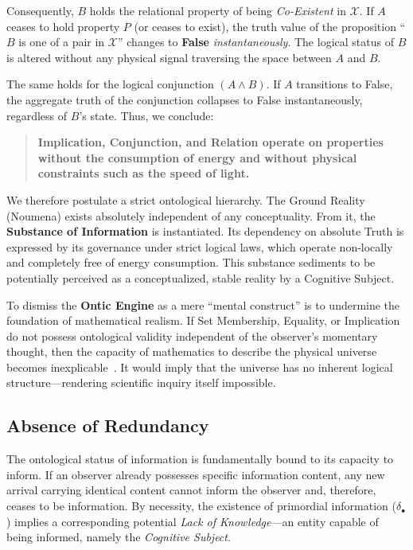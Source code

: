 \documentclass[11pt, a4paper]{article}
\theoremstyle{formalism}
\begin{document}
Consequently, $B$ holds the relational property of being \textit{Co-Existent}
in $\mathcal{X}$. If $A$ ceases to hold property $P$ (or ceases to exist), the
truth value of the proposition ``$B$ is one of a pair in $\mathcal{X}$''
changes to \textbf{False} \textit{instantaneously}. The logical status of $B$
is altered without any physical signal traversing the space between $A$ and
$B$.

The same holds for the logical conjunction $(A \land B)$. If $A$ transitions
to False, the aggregate truth of the conjunction collapses to False
instantaneously, regardless of $B$'s state. Thus, we conclude:

\begin{quote}
    \textbf{Implication, Conjunction, and Relation operate on properties
    without the consumption of energy and without physical constraints 
    such as the speed of light.}
\end{quote}

We therefore postulate a strict ontological hierarchy. The Ground Reality
(Noumena) exists absolutely independent of any conceptuality. From it, the
\textbf{Substance of Information} is instantiated. Its dependency on absolute
Truth is expressed by its governance under strict logical laws, which operate
non-locally and completely free of energy consumption. This substance
sediments to be potentially perceived as a conceptualized, stable reality by a
Cognitive Subject. 

To dismiss the \textbf{Ontic Engine} as a mere ``mental construct'' is to
undermine the foundation of mathematical realism. If Set Membership, Equality,
or Implication do not possess ontological validity independent of the
observer's momentary thought, then the capacity of mathematics to describe the
physical universe becomes inexplicable~\cite{Wigner1960}. It would imply that
the universe has no inherent logical structure---rendering scientific inquiry
itself impossible.

\subsection{Absence of Redundancy}

The ontological status of information is fundamentally bound to its capacity to
inform. If an observer already possesses specific information content, any new
arrival carrying identical content cannot inform the observer and, therefore,
ceases to be information. By necessity, the existence of primordial information
($\delta_\bullet$) implies a corresponding potential \textit{Lack of
Knowledge}---an entity capable of being informed, namely the \textit{Cognitive
Subject}.
\end{document}
